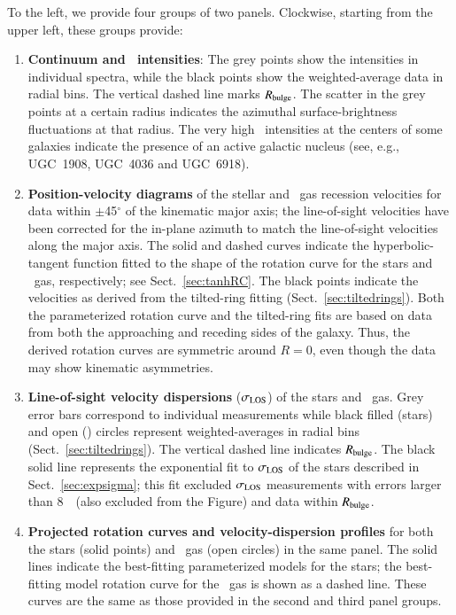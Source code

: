 \documentclass[traditabstract]{aa} %
\begin{document}
To the left, we provide four groups of two panels.  Clockwise, starting from the
upper left, these groups provide:
%
\begin{enumerate}
%
\item {\bf Continuum and \oiii\ intensities}:  The grey points show the
intensities in individual spectra, while the black points show the
weighted-average data in radial bins.  The vertical dashed line marks $R_{\rm bulge}$.
The scatter in the grey points at a certain radius indicates the azimuthal
surface-brightness fluctuations at that radius.  The very high \oiii\
intensities at the centers of some galaxies indicate the presence of an active
galactic nucleus (see, e.g., UGC~1908, UGC~4036 and UGC~6918).
%
\item {\bf Position-velocity diagrams} of the stellar and \oiii\ gas recession
velocities for data within $\pm$45$^{\circ}$ of the kinematic major axis; the
line-of-sight velocities have been corrected for the in-plane azimuth to match
the line-of-sight velocities along the major axis.  The solid and dashed curves
indicate the hyperbolic-tangent function fitted to the shape of the rotation
curve for the stars and \oiii\ gas, respectively; see Sect.~\ref{sec:tanhRC}.
The black points indicate the velocities as derived from the tilted-ring fitting
(Sect.~\ref{sec:tiltedrings}).  Both the parameterized rotation curve and the
tilted-ring fits are based on data from both the approaching and receding sides
of the galaxy.  Thus, the derived rotation curves are symmetric around $R=0$,
even though the data may show kinematic asymmetries.
%
\item {\bf Line-of-sight velocity dispersions} ($\sigma_{\rm LOS}$) of the stars and \oiii\
gas.  Grey error bars correspond to individual measurements while black filled
(stars) and open (\oiii) circles represent weighted-averages in radial bins
(Sect.~\ref{sec:tiltedrings}). The vertical dashed line indicates $R_{\rm bulge}$.
The black solid line represents the exponential fit to $\sigma_{\rm LOS}$ of the stars
described in Sect.~\ref{sec:expsigma}; this fit excluded $\sigma_{\rm LOS}$ measurements
with errors larger than 8~\kms\ (also excluded from the Figure) and data within
$R_{\rm bulge}$.
%
\item {\bf Projected rotation curves and velocity-dispersion profiles} for both
the stars (solid points) and \oiii\ gas (open circles) in the same panel.  The
solid lines indicate the best-fitting parameterized models for the stars; the
best-fitting model rotation curve for the \oiii\ gas is shown as a dashed line.
These curves are the same as those provided in the second and third panel
groups.
%
\end{enumerate}
\end{document}
